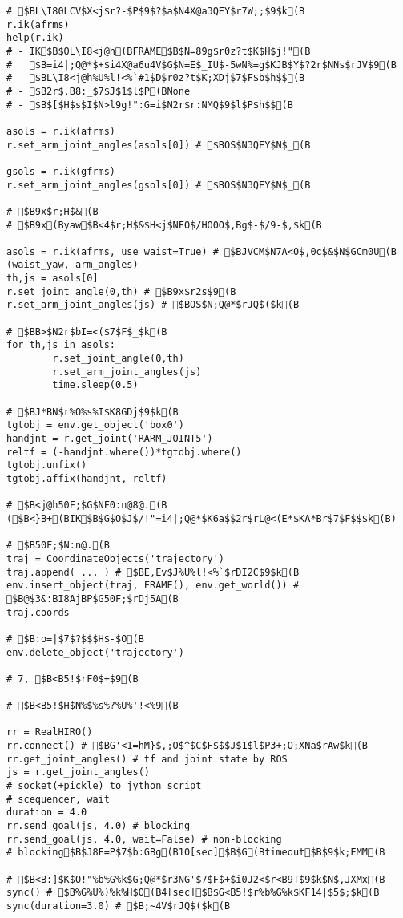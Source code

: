 \documentclass[11pt]{jreport}
\begin{document}
{{{{{{{{{{{{\begin{verbatim}
# $BL\I80LCV$X<j$r?-$P$9$?$a$N4X@a3QEY$r7W;;$9$k(B
r.ik(afrms)
help(r.ik)
# - IK$B$OL\I8<j@h(BFRAME$B$N=89g$r0z?t$K$H$j!"(B
#   $B=i4|;Q@*$+$i4X@a6u4V$G$N=E$_IU$-5wN%=g$KJB$Y$?2r$NNs$rJV$9(B
#   $BL\I8<j@h%U%l!<%`#1$D$r0z?t$K;XDj$7$F$b$h$$(B
# - $B2r$,B8:_$7$J$1$l$P(BNone
# - $B$[$H$s$I$N>l9g!":G=i$N2r$r:NMQ$9$l$P$h$$(B

asols = r.ik(afrms)
r.set_arm_joint_angles(asols[0]) # $BOS$N3QEY$N$_(B

gsols = r.ik(gfrms)
r.set_arm_joint_angles(gsols[0]) # $BOS$N3QEY$N$_(B

# $B9x$r;H$&(B
# $B9x(Byaw$B<4$r;H$&$H<j$NFO$/HO0O$,Bg$-$/9-$,$k(B

asols = r.ik(afrms, use_waist=True) # $BJVCM$N7A<0$,0c$&$N$GCm0U(B (waist_yaw, arm_angles)
th,js = asols[0]
r.set_joint_angle(0,th) # $B9x$r2s$9(B
r.set_arm_joint_angles(js) # $BOS$N;Q@*$rJQ$($k(B

# $BB>$N2r$bI=<($7$F$_$k(B
for th,js in asols:
        r.set_joint_angle(0,th)
        r.set_arm_joint_angles(js)
        time.sleep(0.5)

# $BJ*BN$r%O%s%I$K8GDj$9$k(B
tgtobj = env.get_object('box0')
handjnt = r.get_joint('RARM_JOINT5')
reltf = (-handjnt.where())*tgtobj.where()
tgtobj.unfix()
tgtobj.affix(handjnt, reltf)

# $B<j@h50F;$G$NF0:n@8@.(B ($B<}B+(BIK$B$G$O$J$/!"=i4|;Q@*$K6a$$2r$rL@<(E*$KA*Br$7$F$$$k(B)

# $B50F;$N:n@.(B
traj = CoordinateObjects('trajectory')
traj.append( ... ) # $BE,Ev$J%U%l!<%`$rDI2C$9$k(B
env.insert_object(traj, FRAME(), env.get_world()) # $B@$3&:BI8AjBP$G50F;$rDj5A(B
traj.coords

# $B:o=|$7$?$$$H$-$O(B
env.delete_object('trajectory')

# 7, $B<B5!$rF0$+$9(B

# $B<B5!$H$N%$%s%?%U%'!<%9(B

rr = RealHIRO()
rr.connect() # $BG'<1=hM}$,;O$^$C$F$$$J$1$l$P3+;O;XNa$rAw$k(B
rr.get_joint_angles() # tf and joint state by ROS
js = r.get_joint_angles()
# socket(+pickle) to jython script
# scequencer, wait
duration = 4.0
rr.send_goal(js, 4.0) # blocking
rr.send_goal(js, 4.0, wait=False) # non-blocking
# blocking$B$J8F=P$7$b:GBg(B10[sec]$B$G(Btimeout$B$9$k;EMM(B

# $B<B:]$K$O!"%b%G%k$G;Q@*$r3NG'$7$F$+$i0J2<$r<B9T$9$k$N$,JXMx(B
sync() # $B%G%U%)%k%H$O(B4[sec]$B$G<B5!$r%b%G%k$KF14|$5$;$k(B
sync(duration=3.0) # $B;~4V$rJQ$($k(B


\end{verbatim}}}}}}}}}}}}}
\end{document}
